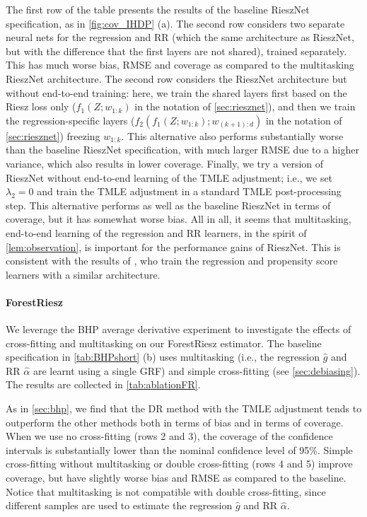 \documentclass[nohyperref]{article}
\theoremstyle{plain}
\theoremstyle{definition}
\theoremstyle{remark}
\begin{document}
The first row of the table presents the results of the baseline RieszNet specification, as in \cref{fig:cov_IHDP} (a). The second row considers two separate neural nets for the regression and RR (which the same architecture as RieszNet, but with the difference that the first layers are not shared), trained separately. This has much worse bias, RMSE and coverage as compared to the multitasking RieszNet architecture. The second row considers the RieszNet architecture but without end-to-end training: here, we train the shared layers first based on the Riesz loss only ($f_1(Z;w_{1:k})$ in the notation of \cref{sec:riesznet}), and then we train the regression-specific layers ($f_2(f_1(Z;w_{1:k}); w_{(k+1):d})$ in the notation of \cref{sec:riesznet}) freezing $w_{1:k}$. This alternative also performs substantially worse than the baseline RieszNet specification, with much larger RMSE due to a higher variance, which also results in lower coverage. Finally, we try a version of RieszNet without end-to-end learning of the TMLE adjustment; i.e., we set $\lambda_2 = 0$ and train the TMLE adjustment in a standard TMLE post-processing step. This alternative performs as well as the baseline RieszNet in terms of coverage, but it has somewhat worse bias. All in all, it seems that multitasking, end-to-end learning of the regression and RR learners, in the spirit of \cref{lem:observation}, is important for the performance gains of RieszNet. This is consistent with the results of \citet{shi2019adapting}, who train the regression and propensity score learners with a similar architecture.

\vspace{-1em}
\paragraph{ForestRiesz} We leverage the BHP average derivative experiment to investigate the effects of cross-fitting and multitasking on our ForestRiesz estimator. The baseline specification in \cref{tab:BHPshort} (b) uses multitasking (i.e., the regression $\widehat{g}$ and RR $\widehat{\alpha}$ are learnt using a single GRF) and simple cross-fitting (see \cref{sec:debiasing}). The results are collected in \cref{tab:ablationFR}. 

As in \cref{sec:bhp}, we find that the DR method with the TMLE adjustment tends to outperform the other methods both in terms of bias and in terms of coverage. When we use no cross-fitting (rows 2 and 3), the coverage of the confidence intervals is substantially lower than the nominal confidence level of 95\%. Simple cross-fitting without multitasking or double cross-fitting (rows 4 and 5) improve coverage, but have slightly worse bias and RMSE as compared to the baseline. Notice that multitasking is not compatible with double cross-fitting, since different samples are used to estimate the regression $\widehat{g}$ and RR $\widehat{\alpha}$. 
\end{document}
